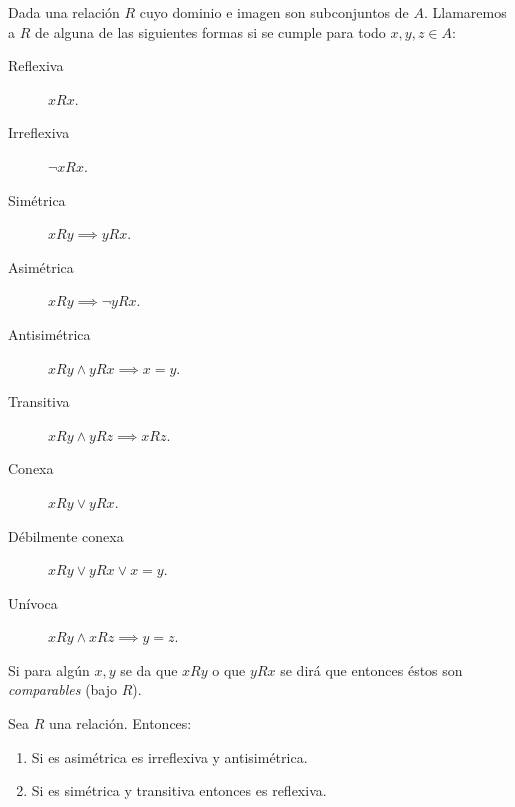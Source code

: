 \documentclass[11pt,a4paper]{book}
\begin{document}
\begin{mydef}
	Dada una relación $R$ cuyo dominio e imagen son subconjuntos de $A$. Llamaremos a $R$ de alguna de las siguientes formas si se cumple para todo $x,y,z\in A$:
	\begin{description}
		\item[Reflexiva] $xRx$.
		\item[Irreflexiva] $\neg xRx$.
		\item[Simétrica] $xRy\implies yRx$.
		\item[Asimétrica] $xRy\implies \neg yRx$.
		\item[Antisimétrica] $xRy\wedge yRx\implies x=y$.
		\item[Transitiva] $xRy\wedge yRz\implies xRz$.
		\item[Conexa] $xRy\vee yRx$.
		\item[Débilmente conexa] $xRy\vee yRx\vee x=y$.
		\item[Unívoca] $xRy\wedge xRz\implies y=z$.
	\end{description}
	Si para algún $x,y$ se da que $xRy$ o que $yRx$ se dirá que entonces éstos son \textit{comparables} (bajo $R$).
\end{mydef}
\begin{prop}
	Sea $R$ una relación. Entonces:
	\begin{enumerate}[$a)$]
		\item Si es asimétrica es irreflexiva y antisimétrica.
		\item Si es simétrica y transitiva entonces es reflexiva.
	\end{enumerate}
\end{prop}
\end{document}
